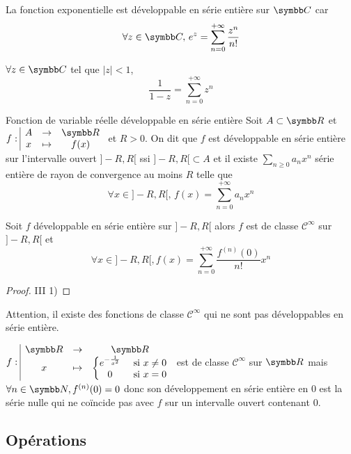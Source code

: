 \begin{exemple}
    La fonction exponentielle est développable en série entière sur $\C$ car 
    \[\forall z \in \C, \, e^z = \sum_{n = 0}^{+\infty} \frac{z^n}{n!}\]

    \lvspace $\forall z \in \C$ tel que $|z| < 1$,
    \[\frac 1 {1 - z} = \sum_{n = 0}^{+\infty} z^n\]
\end{exemple}

\begin{definitionnt}{Fonction de variable réelle développable en série entière}{}
    Soit $A \subset \R$ et $\fonction{f}{A}{\R}{x}{f(x)}$ et $R > 0$. On dit que $f$ est développable
    en série entière sur l'intervalle ouvert $]-R, R[$ ssi $]-R, R[ \subset A$ et il 
    existe $\sum_{n \geqslant 0 } a_n x^n$ série entière de rayon de convergence au moins $R$ telle que
    \[\forall x \in ]-R, R[, \, f(x) = \sum_{n = 0}^{+\infty} a_n x^n\]
\end{definitionnt}

\begin{proposition}{}{}
    Soit $f$ développable en série entière sur $] - R, R[$ alors $f$ est de classe
    $\mathscr {C}^\infty$ sur $]-R, R[$ et 
    \[\forall x \in ]-R, R[, 
    f(x) = \sum_{n = 0}^{+\infty} \frac{f^{(n)}(0)}{n!} x^n\]
\end{proposition}

\begin{proof}
    III 1)
\end{proof}

\begin{remarque}
    Attention, il existe des fonctions de classe $\mathscr {C}^\infty$ qui ne sont pas
    développables en série entière.
\end{remarque}

\begin{exemple}
    $\fonction{f}{\R}{\R}{x}{\left\{ \begin{matrix}
        e^{- \frac 1 {x^2}} & \text{ si } x \neq 0 \\
        0 & \text{ si } x = 0
    \end{matrix} \right.}$ est de classe $\mathscr {C}^\infty$ sur $\R$ mais 
    $\forall n \in \N, f^{(n)}(0) = 0$ donc son développement en série entière en $0$ est
    la série nulle qui ne coïncide pas avec $f$ sur un intervalle ouvert contenant $0$.
\end{exemple}

\subsection{Opérations}

